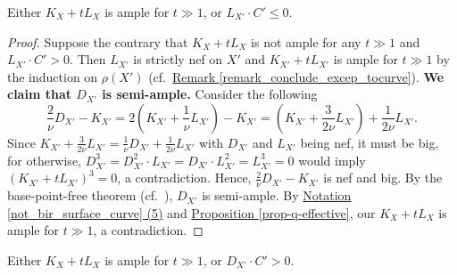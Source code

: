 \begin{lemme}\label{lem_L.C>0}
Either $K_X+tL_X$ is ample for $t\gg 1$, or $L_{X'}\cdot C'\leqslant 0$.
\end{lemme}
\begin{proof}
Suppose the contrary that $K_X+tL_X$ is not ample for any $t\gg 1$ and $L_{X'}\cdot C'>0$. 
Then $L_{X'}$ is strictly nef on $X'$ and $K_{X'}+tL_{X'}$ is ample for  $t\gg 1$ by the induction on $\rho(X')$ (cf.~{\hyperref[remark_conclude_excep_tocurve]{Remark  \ref*{remark_conclude_excep_tocurve}}}). 
\textbf{We claim that $D_{X'}$ is semi-ample.} 
Consider the following 
$$\frac{2}{\nu}D_{X'}-K_{X'}=2(K_{X'}+\frac{1}{\nu}L_{X'})-K_{X'}=(K_{X'}+\frac{3}{2\nu}L_{X'})+\frac{1}{2\nu}L_{X'}.$$
Since $K_{X'}+\frac{3}{2\nu}L_{X'}=\frac{1}{\nu}D_{X'}+\frac{1}{2\nu}L_{X'}$ with $D_{X'}$ and $L_{X'}$ being nef, it must be big, for otherwise, $D_{X'}^3=D_{X'}^2\cdot L_{X'}=D_{X'}\cdot L_{X'}^2=L_{X'}^3=0$ would imply  $(K_{X'}+tL_{X'})^3=0$, a contradiction.
Hence, $\frac{2}{\nu}D_{X'}-K_{X'}$ is nef and big.
By the base-point-free theorem (cf.~\cite[Theorem 3.3]{KM98}), 
$D_{X'}$ is semi-ample. 
By {\hyperref[not_bir_surface_curve]{Notation  \ref*{not_bir_surface_curve} (5)}}
 and {\hyperref[prop-q-effective]{Proposition  \ref*{prop-q-effective}}}, our $K_X+tL_X$ is ample for $t\gg 1$,  a contradiction.
\end{proof}




\begin{lemme}\label{lem_D.C>0}
Either $K_X+tL_X$ is ample for $t\gg 1$, or $D_{X'}\cdot C'>0$.	
\end{lemme}

